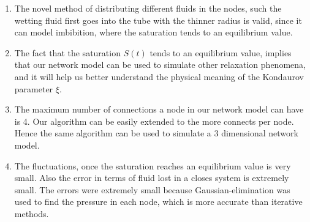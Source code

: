 \begin{enumerate}
	\item The novel method of distributing different fluids in the nodes, such the wetting fluid first goes into the tube with the thinner radius is valid, since it can model imbibition, where the saturation tends to an equilibrium value.
	
	\item The fact that the saturation $S(t)$ tends to an equilibrium value, implies that our network model can be used to simulate other relaxation phenomena, and it will help us better understand the physical meaning of the Kondaurov parameter $\xi$.
	
	\item The maximum number of connections a node in our network model can have is 4. Our algorithm can be easily extended to the more connects per node. Hence the same algorithm can be used to simulate a 3 dimensional network model.
	
	\item The fluctuations, once the saturation reaches an equilibrium value is very small. Also the error in terms of fluid lost in a closes system is extremely small. The errors were extremely small because Gaussian-elimination was used to find the pressure in each node, which is more accurate than iterative methods.	
\end{enumerate}


